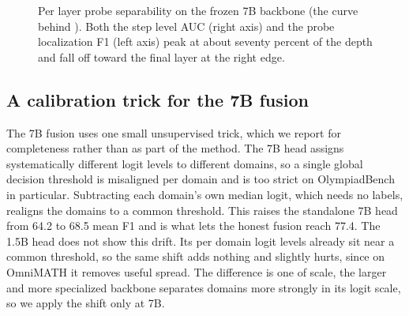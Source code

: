 \begin{figure}[h]
  \centering
  \caption{Per layer probe separability on the frozen 7B backbone (the curve behind ). Both the step level AUC (right axis) and the probe localization F1 (left axis) peak at about seventy percent of the depth and fall off toward the final layer at the right edge.}
  \label{fig:layersweep}
\end{figure}

\subsection{A calibration trick for the 7B fusion}
\label{app:calib}

The 7B fusion uses one small unsupervised trick, which we report for completeness rather than as part of the method. The 7B head assigns systematically different logit levels to different domains, so a single global decision threshold is misaligned per domain and is too strict on OlympiadBench in particular. Subtracting each domain's own median logit, which needs no labels, realigns the domains to a common threshold. This raises the standalone 7B head from 64.2 to 68.5 mean F1 and is what lets the honest fusion reach 77.4. The 1.5B head does not show this drift. Its per domain logit levels already sit near a common threshold, so the same shift adds nothing and slightly hurts, since on OmniMATH it removes useful spread. The difference is one of scale, the larger and more specialized backbone separates domains more strongly in its logit scale, so we apply the shift only at 7B.

